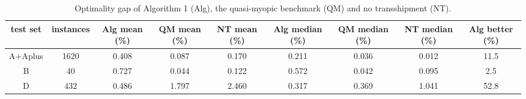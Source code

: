 \begin{table}[H]
\centering
\caption{Optimality gap of Algorithm 1 (Alg), the quasi-myopic benchmark (QM) and no transshipment (NT).}
\label{tab:test3_overall}
\begin{tabular}{ccccccccc}
\toprule
test set & instances & Alg mean (\%) & QM mean (\%) & NT mean (\%) & Alg median (\%) & QM median (\%) & NT median (\%) & Alg better (\%) \\
\midrule
A+Aplus & 1620 & 0.408 & 0.087 & 0.170 & 0.211 & 0.036 & 0.012 & 11.5 \\
B & 40 & 0.727 & 0.044 & 0.122 & 0.572 & 0.042 & 0.095 & 2.5 \\
D & 432 & 0.486 & 1.797 & 2.460 & 0.317 & 0.369 & 1.041 & 52.8 \\
\bottomrule
\end{tabular}
\end{table}